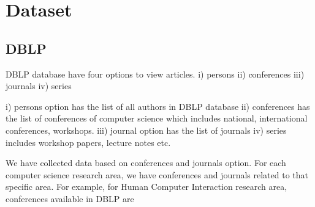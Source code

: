  \section{\textbf{ \LARGE Dataset}}

 \subsection{DBLP}
 DBLP database have four options to view articles. i) persons
 ii) conferences iii) journals iv) series

 i) persons option has the list of all authors in DBLP database
 ii) conferences has the list of conferences of computer science which includes national, international conferences, workshops.
 iii) journal option has the list of journals 
 iv) series includes workshop papers, lecture notes etc. 

 We have collected data based on conferences and journals option. For each computer science research area, we have conferences and journals related to that specific area. For example, for Human Computer Interaction research area, conferences available in DBLP are 